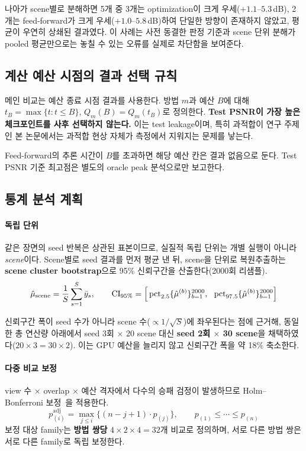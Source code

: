 나아가 scene별로 분해하면 5개 중 3개는 optimization이 크게 우세($+1.1$--$5.3\,$dB), 2개는 feed-forward가 크게 우세($+1.0$--$5.8\,$dB)하여 단일한 방향이 존재하지 않았고, 평균이 우연히 상쇄된 결과였다. 이 사례는 사전 동결한 판정 기준과 scene 단위 분해가 pooled 평균만으로는 놓칠 수 있는 오류를 실제로 차단함을 보여준다.

\subsection{계산 예산 시점의 결과 선택 규칙}
\label{sec:budget-selection}

메인 비교는 예산 종료 시점 결과를 사용한다. 방법 $m$과 예산 $B$에 대해 $t_B = \max\{t : t \le B\}$, $Q_m(B) = Q_m(t_B)$로 정의한다. \textbf{Test PSNR이 가장 높은 체크포인트를 사후 선택하지 않는다.} 이는 test leakage이며, 특히 과적합이 연구 주제인 본 논문에서는 과적합 현상 자체가 측정에서 지워지는 문제를 낳는다.

Feed-forward의 추론 시간이 $B$를 초과하면 해당 예산 칸은 결과 없음으로 둔다. Test PSNR 기준 최고점은 별도의 oracle peak 분석으로만 보고한다.

\subsection{통계 분석 계획}
\label{sec:stats}

\paragraph{독립 단위} 같은 장면의 seed 반복은 상관된 표본이므로, 실질적 독립 단위는 개별 실행이 아니라 \emph{scene}이다. Scene별로 seed 결과를 먼저 평균 낸 뒤, scene을 단위로 복원추출하는 \textbf{scene cluster bootstrap}으로 95\% 신뢰구간을 산출한다(2000회 리샘플).
\begin{equation}
\hat\mu_{\mathrm{scene}} = \frac{1}{S}\sum_{s=1}^{S}\bar y_s,
\qquad
\mathrm{CI}_{95\%} = \Bigl[\,\mathrm{pct}_{2.5}\{\hat\mu^{(b)}\}_{b=1}^{2000},\ \ \mathrm{pct}_{97.5}\{\hat\mu^{(b)}\}_{b=1}^{2000}\Bigr]
\label{eq:bootstrap}
\end{equation}

신뢰구간 폭이 seed 수가 아니라 scene 수($\propto 1/\sqrt{S}$)에 좌우된다는 점에 근거해, 동일한 총 연산량 아래에서 seed 3회 $\times$ 20 scene 대신 \textbf{seed 2회 $\times$ 30 scene}을 채택하였다($20\times3 = 30\times2$). 이는 GPU 예산을 늘리지 않고 신뢰구간 폭을 약 18\% 축소한다.

\paragraph{다중 비교 보정} view 수 $\times$ overlap $\times$ 예산 격자에서 다수의 승패 검정이 발생하므로 Holm--Bonferroni 보정~\cite{holm1979simple}을 적용한다.
\begin{equation}
p_{(i)}^{\mathrm{adj}} = \max_{j \le i}\bigl\{(n - j + 1)\cdot p_{(j)}\bigr\},
\qquad p_{(1)} \le \cdots \le p_{(n)}
\label{eq:holm}
\end{equation}
보정 대상 family는 \textbf{방법 쌍당} $4 \times 2 \times 4 = 32$개 비교로 정의하며, 서로 다른 방법 쌍은 서로 다른 family로 독립 보정한다.

